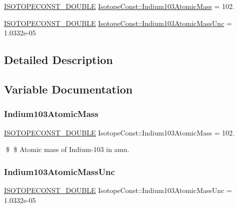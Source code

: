 \begin{DoxyCompactItemize}
\item 
\mbox{\hyperlink{group___isotope_const-_macros_ga8f45a7272ce02c0b4c65c44636ed719a}{I\+S\+O\+T\+O\+P\+E\+C\+O\+N\+S\+T\+\_\+\+D\+O\+U\+B\+LE}} \mbox{\hyperlink{group___isotope_const-_indium-_in103_ga39597d43b01b527f0a19ccf146250346}{Isotope\+Const\+::\+Indium103\+Atomic\+Mass}} = 102.
\item 
\mbox{\hyperlink{group___isotope_const-_macros_ga8f45a7272ce02c0b4c65c44636ed719a}{I\+S\+O\+T\+O\+P\+E\+C\+O\+N\+S\+T\+\_\+\+D\+O\+U\+B\+LE}} \mbox{\hyperlink{group___isotope_const-_indium-_in103_gaa1dfcc43d901263ac982ff46fb23b25d}{Isotope\+Const\+::\+Indium103\+Atomic\+Mass\+Unc}} = 1.\+0332e-\/05
\end{DoxyCompactItemize}


\subsection{Detailed Description}


\subsection{Variable Documentation}
\mbox{\label{group___isotope_const-_indium-_in103_ga39597d43b01b527f0a19ccf146250346}} 
\subsubsection{\texorpdfstring{Indium103\+Atomic\+Mass}{Indium103AtomicMass}}
{\footnotesize\ttfamily \mbox{\hyperlink{group___isotope_const-_macros_ga8f45a7272ce02c0b4c65c44636ed719a}{I\+S\+O\+T\+O\+P\+E\+C\+O\+N\+S\+T\+\_\+\+D\+O\+U\+B\+LE}} Isotope\+Const\+::\+Indium103\+Atomic\+Mass = 102.}

\$ \$ Atomic mass of Indium-\/103 in amu. \mbox{\label{group___isotope_const-_indium-_in103_gaa1dfcc43d901263ac982ff46fb23b25d}} 
\subsubsection{\texorpdfstring{Indium103\+Atomic\+Mass\+Unc}{Indium103AtomicMassUnc}}
{\footnotesize\ttfamily \mbox{\hyperlink{group___isotope_const-_macros_ga8f45a7272ce02c0b4c65c44636ed719a}{I\+S\+O\+T\+O\+P\+E\+C\+O\+N\+S\+T\+\_\+\+D\+O\+U\+B\+LE}} Isotope\+Const\+::\+Indium103\+Atomic\+Mass\+Unc = 1.\+0332e-\/05}

